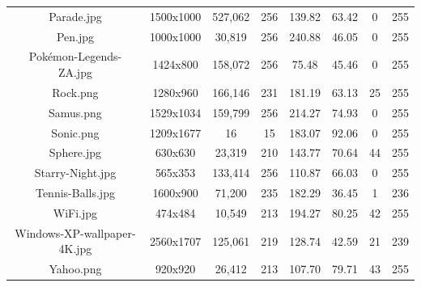 \documentclass[11pt,a4paper]{article}
\begin{document}
\begin{table}[htbp]
\begin{tabular}{|c|c|c|c|c|c|c|c|}
    Parade.jpg               & 1500x1000  & 527,062 & 256 & 139.82 & 63.42  & 0 & 255 \\
    Pen.jpg                  & 1000x1000  & 30,819  & 256 & 240.88 & 46.05  & 0 & 255 \\
    Pokémon-Legends-ZA.jpg   & 1424x800   & 158,072 & 256 & 75.48  & 45.46  & 0 & 255 \\
    Rock.png                 & 1280x960   & 166,146 & 231 & 181.19 & 63.13  & 25 & 255 \\
    Samus.png                & 1529x1034  & 159,799 & 256 & 214.27 & 74.93  & 0 & 255 \\
    Sonic.png                & 1209x1677  & 16      & 15  & 183.07 &  92.06 & 0 & 255 \\
    Sphere.jpg               & 630x630    & 23,319  & 210 & 143.77 & 70.64  & 44 & 255 \\
    Starry-Night.jpg         & 565x353    & 133,414 & 256 & 110.87 & 66.03  & 0 & 255 \\
    Tennis-Balls.jpg         & 1600x900   & 71,200  & 235 & 182.29 & 36.45  & 1 & 236 \\
    WiFi.jpg                 & 474x484    & 10,549  & 213 & 194.27 & 80.25  & 42 & 255 \\
    Windows-XP-wallpaper-4K.jpg & 2560x1707 & 125,061 & 219 & 128.74 & 42.59  & 21 & 239 \\
    Yahoo.png                & 920x920    & 26,412  & 213 & 107.70 & 79.71  & 43 & 255 \\
    \hline
  \end{tabular}
\end{table}

\end{document}
